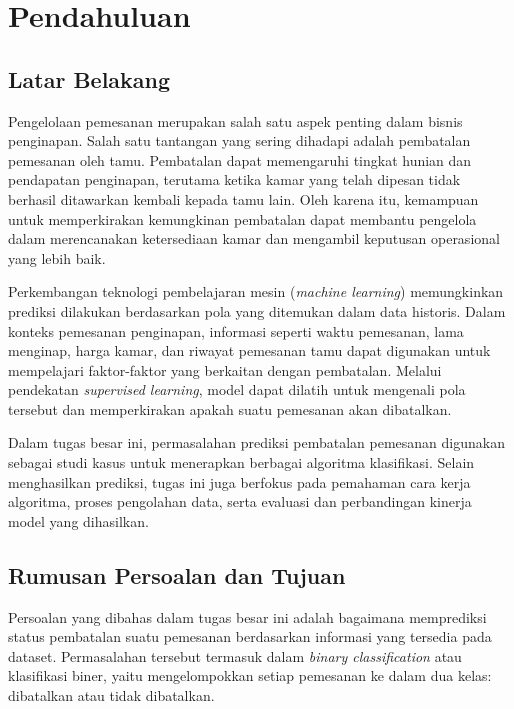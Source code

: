 
\section{Pendahuluan}

\subsection{Latar Belakang}
Pengelolaan pemesanan merupakan salah satu aspek penting dalam bisnis
penginapan. Salah satu tantangan yang sering dihadapi adalah pembatalan
pemesanan oleh tamu. Pembatalan dapat memengaruhi tingkat hunian dan pendapatan
penginapan, terutama ketika kamar yang telah dipesan tidak berhasil ditawarkan
kembali kepada tamu lain. Oleh karena itu, kemampuan untuk memperkirakan
kemungkinan pembatalan dapat membantu pengelola dalam merencanakan ketersediaan
kamar dan mengambil keputusan operasional yang lebih baik.

Perkembangan teknologi pembelajaran mesin (\textit{machine learning})
memungkinkan prediksi dilakukan berdasarkan pola yang ditemukan dalam data
historis. Dalam konteks pemesanan penginapan, informasi seperti waktu pemesanan,
lama menginap, harga kamar, dan riwayat pemesanan tamu dapat digunakan untuk
mempelajari faktor-faktor yang berkaitan dengan pembatalan. Melalui pendekatan
\textit{supervised learning}, model dapat dilatih untuk mengenali pola tersebut
dan memperkirakan apakah suatu pemesanan akan dibatalkan.

Dalam tugas besar ini, permasalahan prediksi pembatalan pemesanan digunakan
sebagai studi kasus untuk menerapkan berbagai algoritma klasifikasi. Selain
menghasilkan prediksi, tugas ini juga berfokus pada pemahaman cara kerja
algoritma, proses pengolahan data, serta evaluasi dan perbandingan kinerja model
yang dihasilkan.

\subsection{Rumusan Persoalan dan Tujuan}

Persoalan yang dibahas dalam tugas besar ini adalah bagaimana memprediksi status
pembatalan suatu pemesanan berdasarkan informasi yang tersedia pada dataset.
Permasalahan tersebut termasuk dalam \textit{binary classification} atau
klasifikasi biner, yaitu mengelompokkan setiap pemesanan ke dalam dua kelas:
dibatalkan atau tidak dibatalkan.

